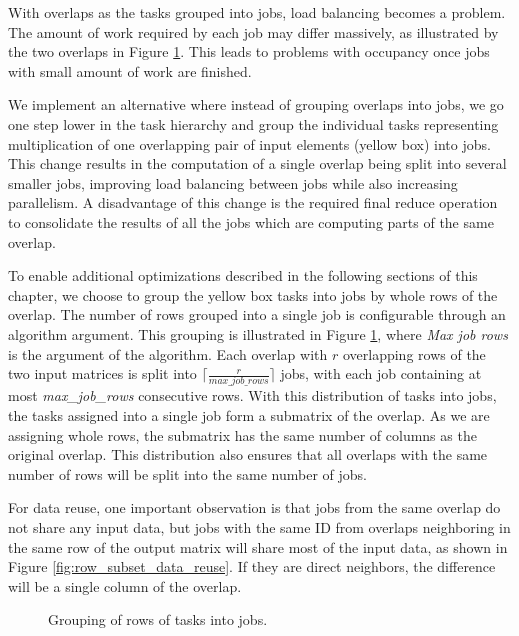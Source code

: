 
With overlaps as the tasks grouped into jobs, load balancing becomes a problem. The amount of work required by each job may differ massively, as illustrated by the two overlaps in Figure \ref{fig:row_subset_tasks}. This leads to problems with occupancy once jobs with small amount of work are finished. 

We implement an alternative where instead of grouping overlaps into jobs, we go one step lower in the task hierarchy and group the individual tasks representing multiplication of one overlapping pair of input elements (yellow box) into jobs. This change results in the computation of a single overlap being split into several smaller jobs, improving load balancing between jobs while also increasing parallelism. A disadvantage of this change is the required final reduce operation to consolidate the results of all the jobs which are computing parts of the same overlap.

To enable additional optimizations described in the following sections of this chapter, we choose to group the yellow box tasks into jobs by whole rows of the overlap. The number of rows grouped into a single job is configurable through an algorithm argument. This grouping is illustrated in Figure \ref{fig:row_subset_tasks}, where \textit{Max job rows} is the argument of the algorithm. Each overlap with $r$ overlapping rows of the two input matrices is split into $\lceil \frac{r}{max\_job\_rows} \rceil$ jobs, with each job containing at most \textit{max\_job\_rows} consecutive rows. With this distribution of tasks into jobs, the tasks assigned into a single job form a submatrix of the overlap. As we are assigning whole rows, the submatrix has the same number of columns as the original overlap. This distribution also ensures that all overlaps with the same number of rows will be split into the same number of jobs.

For data reuse, one important observation is that jobs from the same overlap do not share any input data, but jobs with the same ID from overlaps neighboring in the same row of the output matrix will share most of the input data, as shown in Figure \ref{fig:row_subset_data_reuse}. If they are direct neighbors, the difference will be a single column of the overlap.

\begin{figure}[ht]
	\centering
	\def\svgwidth{0.6\textwidth}
	\fontsize{8}{10}\selectfont
	
	\caption{Grouping of rows of tasks into jobs.}
	\label{fig:row_subset_tasks}
\end{figure}

